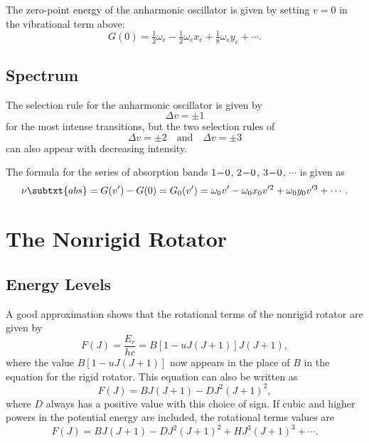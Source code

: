 The zero-point energy of the anharmonic oscillator is given by setting $v = 0$ in the vibrational term above:
\begin{equation*}
    G(0) = \tfrac{1}{2}\omega_e - \tfrac{1}{2}\omega_ex_e + \tfrac{1}{8}\omega_ey_e + \dotsb.
\end{equation*}

\subsection{Spectrum}

The selection rule for the anharmonic oscillator is given by
\begin{equation*}
    \Delta{}v = \pm 1
\end{equation*}
for the most intense transitions, but the two selection rules of
\begin{equation*}
    \Delta{}v = \pm 2 \quad\text{and}\quad \Delta{}v = \pm 3
\end{equation*}
can also appear with decreasing intensity.

The formula for the series of absorption bands $1\!-\!0$, $2\!-\!0$, $3\!-\!0$, $\dotsb$ is given as
\begin{equation*}
    \nu\subtxt{abs} = G(v') - G(0) = G_0(v') = \omega_0v' - \omega_0x_0v'^2 + \omega_0y_0v'^3 + \dotsb.
\end{equation*}

\section{The Nonrigid Rotator}
\label{s:the_nonrigid_rotator}

\subsection{Energy Levels}

A good approximation shows that the rotational terms of the nonrigid rotator are given by
\begin{equation*}
    F(J) = \frac{E_r}{hc} = B[1 - uJ(J + 1)]J(J + 1),
\end{equation*}
where the value $B[1 - uJ(J + 1)]$ now appears in the place of $B$ in the equation for the rigid rotator. This equation can also be written as
\begin{equation*}
    F(J) = BJ(J + 1) - DJ^2(J + 1)^2,
\end{equation*}
where $D$ always has a positive value with this choice of sign. If cubic and higher powers in the potential energy are included, the rotational terms values are
\begin{equation*}
    F(J) = BJ(J + 1) - DJ^2(J + 1)^2 + HJ^3(J + 1)^3 + \dotsb.
\end{equation*}

